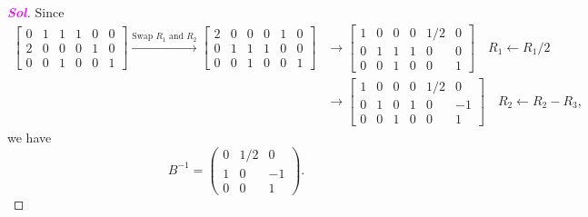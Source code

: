 \documentclass[10pt]{article}
\theoremstyle{definition}
\newcommand{\sol}{\textcolor{magenta}{\bf Sol}}
\newcommand{\inv}[1]{{#1}^{-1}}
\begin{document}
\begin{enumerate}[\bf 1.]
\begin{figure}[h!]
\end{figure}
\begin{proof}[\sol]
	 Since \begin{align*}
		\left[\begin{array}{ccc|ccc}
			0&1&1 &1&0&0\\
			2&0&0 &0&1&0\\
			0&0&1 &0&0&1
		\end{array}\right]\xrightarrow{\text{Swap $R_1$ and $R_2$}}\left[\begin{array}{ccc|ccc}
		2&0&0 &0&1&0\\
		0&1&1 &1&0&0\\
		0&0&1 &0&0&1
	\end{array}\right]&\rightarrow\left[\begin{array}{ccc|ccc}
	1&0&0 &0&1/2&0\\
	0&1&1 &1&0&0\\
	0&0&1 &0&0&1
\end{array}\right]\quad R_1\gets R_1/2\\
	&\rightarrow\left[\begin{array}{ccc|ccc}
		1&0&0 &0&1/2&0\\
		0&1&0 &1&0&-1\\
		0&0&1 &0&0&1
	\end{array}\right]\quad R_2\gets R_2-R_3,
	\end{align*} we have $$\inv{B}=\begin{pmatrix}
	0&1/2&0\\1&0&-1\\0&0&1
\end{pmatrix}.$$
\end{proof}


\end{enumerate}
\end{document}
